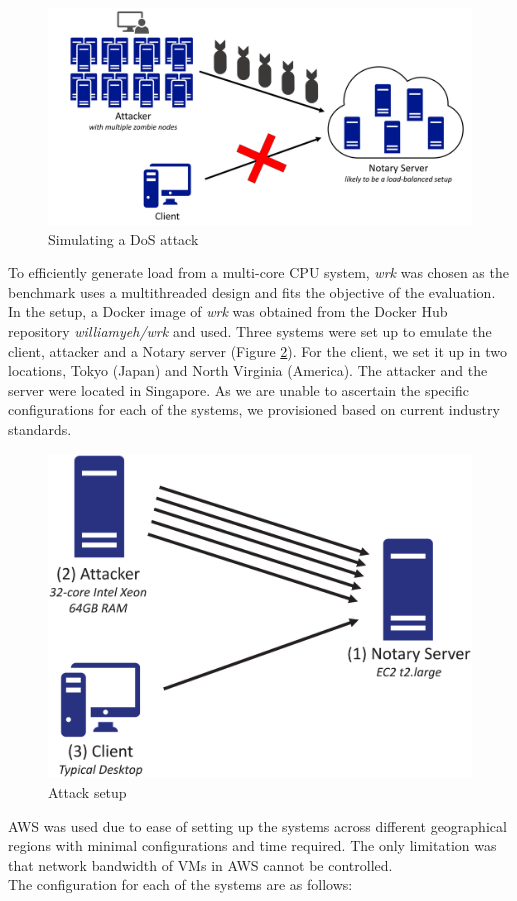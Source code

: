 \documentclass[a4paper,12pt]{article}
\begin{document}
{{	\begin{figure}[H]
		\centering
		\includegraphics[width=0.7\linewidth]{ddos}
		\caption{Simulating a DoS attack}
		\label{fig:ddos}
	\end{figure}
	
	{\par \noindent To efficiently generate load from a multi-core CPU system, \textit{wrk} was chosen as the benchmark uses a multithreaded design and fits the objective of the evaluation. In the setup, a Docker image of \textit{wrk} was obtained from the Docker Hub repository \textit{williamyeh/wrk} and used. Three systems were set up to emulate the client, attacker and a Notary server (Figure \ref{fig:attack-setup}). For the client, we set it up in two locations, Tokyo (Japan) and North Virginia (America). The attacker and the server were located in Singapore. As we are unable to ascertain the specific configurations for each of the systems, we provisioned based on current industry standards.}
	\begin{figure}[H]
		\centering
		\includegraphics[width=0.6\linewidth]{attacksetup}
		\caption{Attack setup}
		\label{fig:attack-setup}
	\end{figure}
	{\par \noindent \ac{AWS} was used due to ease of setting up the systems across different geographical regions with minimal configurations and time required. The only limitation was that network bandwidth of \ac{VM}s in \ac{AWS} cannot be controlled. \\\newline The configuration for each of the systems are as follows:}
}}
\end{document}
